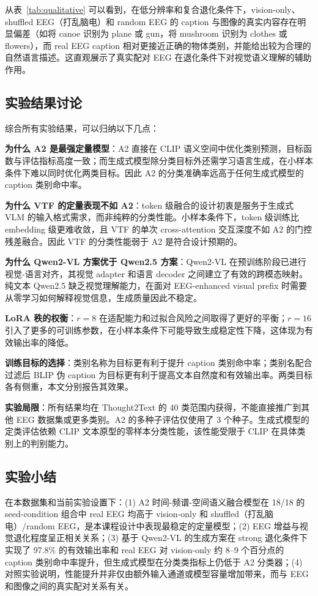 从表~\ref{tab:qualitative} 可以看到，在低分辨率和复合退化条件下，vision-only、shuffled EEG（打乱脑电）和 random EEG 的 caption 与图像的真实内容存在明显偏差（如将 canoe 识别为 plane 或 gun，将 mushroom 识别为 clothes 或 flowers），而 real EEG caption 相对更接近正确的物体类别，并能给出较为合理的自然语言描述。这直观展示了真实配对 EEG 在退化条件下对视觉语义理解的辅助作用。

\subsection{实验结果讨论}

综合所有实验结果，可以归纳以下几点：

\textbf{为什么 A2 是最强定量模型}：A2 直接在 CLIP 语义空间中优化类别预测，目标函数与评估指标高度一致；而生成式模型除分类目标外还需学习语言生成，在小样本条件下难以同时优化两类目标。因此 A2 的分类准确率远高于任何生成式模型的 caption 类别命中率。

\textbf{为什么 VTF 的定量表现不如 A2}：token 级融合的设计初衷是服务于生成式 VLM 的输入格式需求，而非纯粹的分类性能。小样本条件下，token 级训练比 embedding 级更难收敛，且 VTF 的单次 cross-attention 交互深度不如 A2 的门控残差融合。因此 VTF 的分类性能弱于 A2 是符合设计预期的。

\textbf{为什么 Qwen2-VL 方案优于 Qwen2.5 方案}：Qwen2-VL 在预训练阶段已进行视觉-语言对齐，其视觉 adapter 和语言 decoder 之间建立了有效的跨模态映射。纯文本 Qwen2.5 缺乏视觉理解能力，在面对 EEG-enhanced visual prefix 时需要从零学习如何解释视觉信息，生成质量因此不稳定。

\textbf{LoRA 秩的权衡}：$r=8$ 在适配能力和过拟合风险之间取得了更好的平衡；$r=16$ 引入了更多的可训练参数，在小样本条件下可能导致生成稳定性下降，这体现为有效输出率的降低。

\textbf{训练目标的选择}：类别名称为目标更有利于提升 caption 类别命中率；类别名配合过滤后 BLIP 伪 caption 为目标更有利于提高文本自然度和有效输出率。两类目标各有侧重，本文分别报告其效果。

\textbf{实验局限}：所有结果均在 Thought2Text 的 40 类范围内获得，不能直接推广到其他 EEG 数据集或更多类别。A2 的多种子评估仅使用了 3 个种子。生成式模型的定类评估依赖 CLIP 文本原型的零样本分类性能，该性能受限于 CLIP 在具体类别上的判别能力。

\subsection{实验小结}

在本数据集和当前实验设置下：(1) A2 时间-频谱-空间语义融合模型在 18/18 的 seed-condition 组合中 real EEG 均高于 vision-only 和 shuffled（打乱脑电）/random EEG，是本课程设计中表现最稳定的定量模型；(2) EEG 增益与视觉退化程度呈正相关关系；(3) 基于 Qwen2-VL 的生成方案在 strong 退化条件下实现了 97.8\% 的有效输出率和 real EEG 对 vision-only 约 8--9 个百分点的 caption 类别命中率提升，但生成式模型在分类类指标上仍低于 A2 分类器；(4) 对照实验说明，性能提升并非仅由额外输入通道或模型容量增加带来，而与 EEG 和图像之间的真实配对关系有关。
